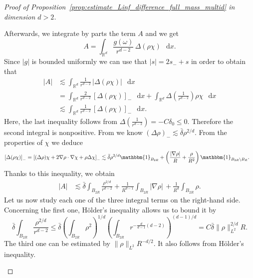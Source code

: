 \documentclass[11pt,a4paper]{article}
\numberwithin{equation}{section}
\newcommand{\R}{{\mathbb{R}}}
\theoremstyle{plain}
\theoremstyle{remark}
\newcommand {\f}{\frac}
\newcommand{\diff}{\mathop{}\!\mathrm{d}}
\begin{document}
\begin{proof}[Proof of Proposition~\ref{prop:estimate_Linf_difference_full_mass_multid} in dimension $d>2$]
\begin{enumeratesteps}
Afterwards, we integrate by parts the term $A$ and we get  
$$
    A = \int_{\R^{d}} \f{g(\omega)}{r^{d-2}}\, \Delta (\rho\chi)\, \diff x.
$$
Since $|g|$ is bounded uniformly  we can use that  $|s| = 2 s_{-} + s$ in order to obtain that  
\begin{align*}
|A| &\lesssim \int_{\R^{d}}
\f{1}{r^{d-2}}\, |\Delta (\rho\chi)|\,
\diff x\\
&= \int_{\R^{d}}
\f{2}{r^{d-2}}\, [\Delta (\rho\chi)]_-\,
\diff x+\int_{\R^{d}}
\Delta\left(\f{1}{r^{d-2}}\right)\rho\chi\,
\diff x\\
&\lesssim \int_{\R^{d}}
\f{1}{r^{d-2}}\, [\Delta (\rho\chi)]_-\,
\diff x.
\end{align*}
Here, the last inequality follows from
$
\Delta\left(\f{1}{r^{d-2}}\right) = -C\delta_{0}\leq 0.
$
Therefore the second integral is nonpositive. From  we know  $
(\Delta\rho)_{-} \lesssim \bar\delta\rho^{2/d}
$. From the properties of $\chi$ we deduce
\begin{align*}
\left[\Delta(\rho\chi)\right]_{-} &= \left[(\Delta \rho)\chi + 2\nabla\rho\cdot\nabla \chi + \rho\Delta\chi \right]_{-} \lesssim \bar\delta\rho^{2/d}\mathbbm{1}_{B_{2R}} + \left(\f{|\nabla \rho|}{R} + \f{\rho}{R^2}\right)\mathbbm{1}_{B_{2R}\setminus B_{R}}.
\end{align*}
Thanks to this inequality, we obtain 
\begin{align*}
|A|&\lesssim \bar\delta\int_{B_{2R}} \f{\rho^{2/d}}{r^{d-2}} + \f{1}{R^{d-1}} \int_{B_{2R}} |\nabla\rho|\,  + \f{1}{R^{d}} \int_{B_{2R}} \rho .
\end{align*}
Let us now study each one of the three integral terms on the right-hand side. 
Concerning the first one, H\"older's inequality allows us to bound it by
$$
\bar\delta\int_{B_{2R}} \f{\rho^{2/d}}{r^{d-2}} \leq \bar\delta\left(\int_{B_{2R}} \rho^{2}\right)^{1/d}\left(\int_{B_{2R}}r^{-\frac{d}{d-1}(d-2)} \right)^{(d-1)/d} =C \bar\delta\|\rho\|_{L^2}^{2/d} R.
$$
The third one can  be estimated by $ \|\rho\|_{L^2}R^{-d/2}$. It also follows from H\"older's inequality.


\end{enumeratesteps}
\end{proof}
\end{document}
